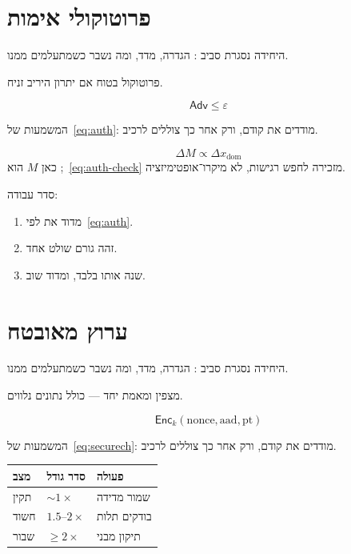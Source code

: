 \chapter{פרוטוקולי אימות}
\label{ch:auth}

היחידה נסגרת סביב : הגדרה, מדד, ומה נשבר כשמתעלמים ממנו.

\begin{thmbox}[frametitle={משפט — פרוטוקולי אימות}]
פרוטוקול בטוח אם יתרון היריב זניח.
\end{thmbox}

\begin{equation}
\label{eq:auth}
\mathsf{Adv} \le \varepsilon
\end{equation}

המשמעות של~\eqref{eq:auth}: מודדים את  קודם, ורק אחר כך צוללים לרכיב.

\begin{equation}
\label{eq:auth-check}
\Delta M \propto \Delta x_{\mathrm{dom}}
\end{equation}
כאן $M$ הוא ;~\eqref{eq:auth-check} מזכירה לחפש רגישות, לא מיקרו־אופטימיזציה.

סדר עבודה:
\begin{enumerate}
\item[(\textbf{א})] מדוד את  לפי~\eqref{eq:auth}.
\item[(\textbf{ב})] זהה גורם שולט אחד.
\item[(\textbf{ג})] שנה אותו בלבד, ומדוד שוב.
\end{enumerate}

\chapter{ערוץ מאובטח}
\label{ch:securech}

היחידה נסגרת סביב : הגדרה, מדד, ומה נשבר כשמתעלמים ממנו.

\begin{defbox}[frametitle={הגדרה — ערוץ מאובטח}]
 מצפין ומאמת יחד — כולל נתונים נלווים.
\end{defbox}

\begin{equation}
\label{eq:securech}
\mathsf{Enc}_k(\mathrm{nonce},\mathrm{aad},\mathrm{pt})
\end{equation}

המשמעות של~\eqref{eq:securech}: מודדים את  קודם, ורק אחר כך צוללים לרכיב.

\begin{tablebox}\centering\small
\begin{tabular}{@{}lll@{}}
\toprule
\textbf{מצב} & \textbf{סדר גודל} & \textbf{פעולה}\\
\midrule
תקין & $\sim 1\times$ & שמור מדידה\\
חשוד & $1.5$–$2\times$ & בודקים תלות\\
שבור & $\ge 2\times$ & תיקון מבני\\
\bottomrule
\end{tabular}
\end{tablebox}

